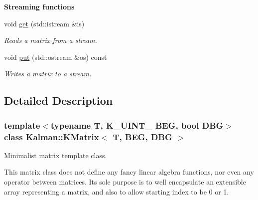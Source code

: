 \begin{Indent}\textbf{ Streaming functions}\par
\begin{DoxyCompactItemize}
\item 
void \mbox{\hyperlink{classKalman_1_1KMatrix_a826babb86bccf462a9206681f3ac9160}{get}} (std\+::istream \&is)
\begin{DoxyCompactList}\small\item\em Reads a matrix from a stream. \end{DoxyCompactList}\item 
void \mbox{\hyperlink{classKalman_1_1KMatrix_aa71c0b0962aafb9ba3f811a744b010d9}{put}} (std\+::ostream \&os) const
\begin{DoxyCompactList}\small\item\em Writes a matrix to a stream. \end{DoxyCompactList}\end{DoxyCompactItemize}
\end{Indent}


\subsection{Detailed Description}
\subsubsection*{template$<$typename T, K\+\_\+\+U\+I\+N\+T\+\_ B\+EG, bool D\+BG$>$\newline
class Kalman\+::\+K\+Matrix$<$ T, B\+E\+G, D\+B\+G $>$}

Minimalist matrix template class. 

This matrix class does not define any fancy linear algebra functions, nor even any operator between matrices. Its sole purpose is to well encapsulate an extensible array representing a matrix, and also to allow starting index to be 0 or 1.

